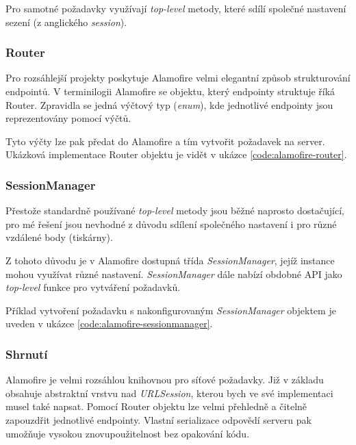 Pro samotné požadavky využívají \textit{top-level} metody, které sdílí společné nastavení sezení (z anglického \textit{session}).

\subsubsection*{Router}

Pro rozsáhlejší projekty poskytuje Alamofire velmi elegantní způsob strukturování endpointů.
V terminilogii Alamofire se objektu, který endpointy struktuje říká Router.
Zpravidla se jedná výčtový typ (\textit{enum}), kde jednotlivé endpointy jsou reprezentovány pomocí výčtů.

Tyto výčty lze pak předat do Alamofire a tím vytvořit požadavek na server.
Ukázková implementace Router objektu je vidět v ukázce \ref{code:alamofire-router}.


\subsubsection*{SessionManager}

Přestože standardně používané \textit{top-level} metody jsou běžné naprosto dostačující, pro mé řešení jsou nevhodné z důvodu sdílení společného nastavení i pro různé vzdálené body (tiskárny).

Z tohoto důvodu je v Alamofire dostupná třída \textit{SessionManager}, jejíž instance mohou využívat různé nastavení.
\textit{SessionManager} dále nabízí obdobné API jako \textit{top-level} funkce pro vytváření požadavků.

Příklad vytvoření požadavku s nakonfigurovaným \textit{SessionManager} objektem je uveden v ukázce \ref{code:alamofire-sessionmanager}.


\subsubsection*{Shrnutí}

Alamofire je velmi rozsáhlou knihovnou pro síťové požadavky.
Již v základu obsahuje abstraktní vrstvu nad \textit{URLSession}, kterou bych ve své implementaci musel také napsat.
Pomocí Router objektu lze velmi přehledně a čitelně zapouzdřit jednotlivé endpointy.
Vlastní serializace odpovědí serveru pak umožňuje vysokou znovupoužitelnost bez opakování kódu.

